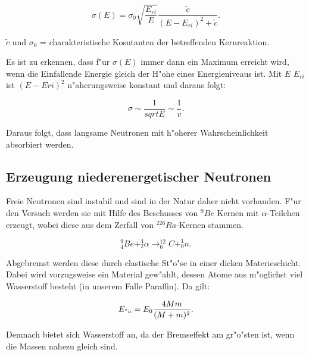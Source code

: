 			\begin{equation*}
				\sigma(E) = \sigma_0 \sqrt{\frac{E_{ri}}{E}} \frac{\tilde{c}}{(E - E_{ri})^2 + \tilde{c}}.
			\end{equation*}

			\begin{center}
					\tiny{$\tilde{c}$ und $\sigma_0$ = charakteristische Kosntanten der betreffenden Kernreaktion}.
			\end{center}

			Es ist zu erkennen, dass f"ur $\sigma (E)$ immer dann ein Maximum erreicht wird, wenn die Einfallende Energie gleich der H"ohe eines Energieniveaus ist.
			Mit $E$ \ll $E_{ri}$ ist $(E - E{ri})^2$ n"aherungsweise konstant und daraus folgt:

			\begin{equation}
				\sigma \sim \frac{1}{sqrt{E}} \sim \frac{1}{v}.
			\end{equation}

			Daraus folgt, dass langsame Neutronen mit h"oherer Wahrscheinlichkeit absorbiert werden.

	\subsection{Erzeugung niederenergetischer Neutronen}
	\label{sub:erzeugung_niederenergetischer_neutronen}

		Freie Neutronen sind instabil und sind in der Natur daher nicht vorhanden.
		F"ur den Versuch werden sie mit Hilfe des Beschusses von $^9Be$ Kernen mit $\alpha$-Teilchen erzeugt, wobei diese aus dem Zerfall von $^{226}Ra$-Kernen stammen.

		\begin{equation*}
			^9_4Be + ^4_2\alpha \rightarrow ^{12}_6C +^1_0n.
		\end{equation*}

		Abgebremst werden diese durch elastische St"o"se in einer dicken Materieschicht.
		Dabei wird vorzugsweise ein Material gew"ahlt, dessen Atome aus m"oglichst viel Wasserstoff besteht (in unserem Falle Paraffin).
		Da gilt:

		\begin{equation*}
			E_{"u} = E_0 \frac{4Mm}{(M+m)^2}.
		\end{equation*}

		Demnach bietet sich Wasserstoff an, da der Bremseffekt am gr"o"sten ist, wenn die Massen nahezu gleich sind.

